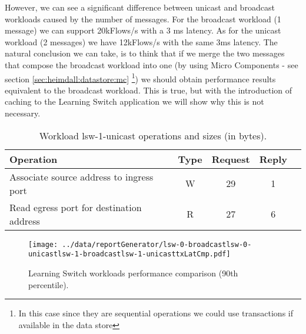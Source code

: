 However, we can see a significant difference between unicast and broadcast workloads caused by the number of messages. 
For the broadcast workload (1 message) we can support 20kFlows/s with a 3 ms latency.  
As for the unicast workload (2 messages) we have 12kFlows/s with the same 3ms latency. 
The natural conclusion we can take, is to think that if we merge the two messages that compose the broadcast workload into one (by using Micro Components - see section \ref{sec:heimdall:datastore:mc} \footnote{In this case since they are sequential operations we could use transactions if available in the data store}) we should obtain performance results equivalent to the broadcast workload. 
This is true, but with the introduction of caching to the Learning Switch application we will show why this is not necessary. 

\begin{table}[ht]
\small
\centering 
\begin{tabular}{l c c c c}
Operation & Type & Request & Reply \\ \toprule 
Associate source address to ingress port & W & 29 & 1\\
Read egress port for destination address & R & 27 & 6 \\ \bottomrule
\end{tabular}
\caption[Workload lsw-1-unicast operations]{Workload lsw-1-unicast operations and sizes (in bytes).}
\label{table:lsw1:unicast}
\end{table}

\begin{figure}[ht]
\centering
\texttt{[image: ../data/reportGenerator/lsw-0-broadcastlsw-0-unicastlsw-1-broadcastlsw-1-unicasttxLatCmp.pdf]}
\caption[Learning Switch workloads performance comparison]{Learning
  Switch workloads performance comparison (90th percentile). }
\label{fig:lsw:comparison}
\end{figure}

